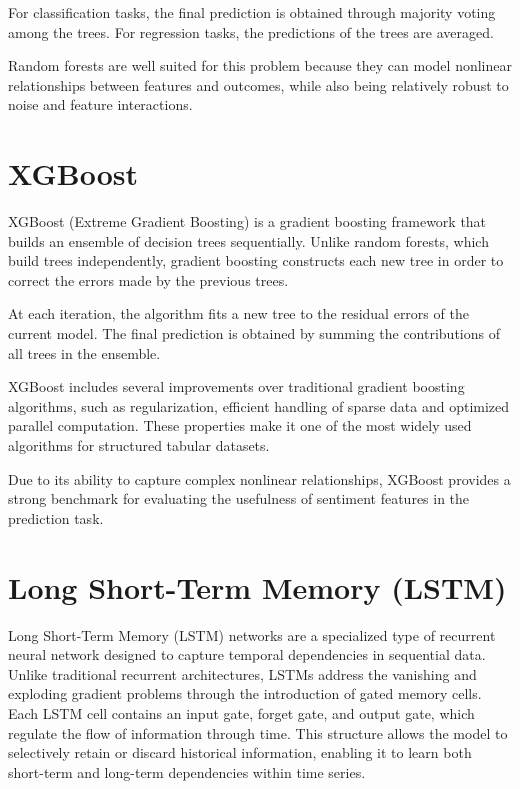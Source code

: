 For classification tasks, the final prediction is obtained through majority voting among the trees. For regression tasks, the predictions of the trees are averaged.

Random forests are well suited for this problem because they can model nonlinear relationships between features and outcomes, while also being relatively robust to noise and feature interactions.

\section{XGBoost}

XGBoost (Extreme Gradient Boosting) is a gradient boosting framework that builds an ensemble of decision trees sequentially. Unlike random forests, which build trees independently, gradient boosting constructs each new tree in order to correct the errors made by the previous trees.

At each iteration, the algorithm fits a new tree to the residual errors of the current model. The final prediction is obtained by summing the contributions of all trees in the ensemble.

XGBoost includes several improvements over traditional gradient boosting algorithms, such as regularization, efficient handling of sparse data and optimized parallel computation. These properties make it one of the most widely used algorithms for structured tabular datasets.

Due to its ability to capture complex nonlinear relationships, XGBoost provides a strong benchmark for evaluating the usefulness of sentiment features in the prediction task.

\section{Long Short-Term Memory (LSTM)}

Long Short-Term Memory (LSTM)\cite{lstm1997} networks are a specialized type of recurrent neural network designed to capture temporal dependencies in sequential data. Unlike traditional recurrent architectures, LSTMs address the vanishing and exploding gradient problems through the introduction of gated memory cells. Each LSTM cell contains an input gate, forget gate, and output gate, which regulate the flow of information through time. This structure allows the model to selectively retain or discard historical information, enabling it to learn both short-term and long-term dependencies within time series.


